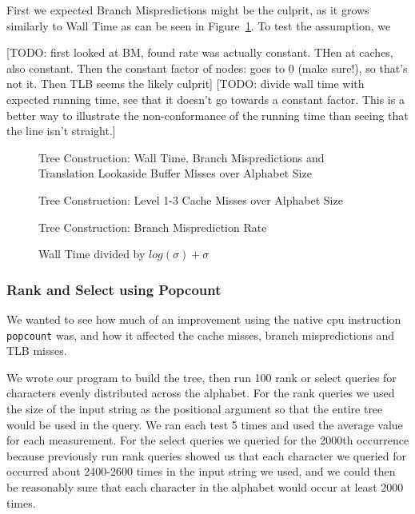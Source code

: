 First we expected Branch Mispredictions might be the culprit, as it grows similarly to Wall Time as can be seen in Figure~\ref{fig:naiveIntegerAlphabetSize_WallTime_BM_TLB}.
To test the assumption, we 

[TODO: first looked at BM, found rate was actually constant. THen at caches, also constant. Then the constant factor of nodes: goes to 0 (make sure!), so that's not it. Then TLB seems the likely culprit]
[TODO: divide wall time with expected running time, see that it doesn't go towards a constant factor. This is a better way to illustrate the non-conformance of the running time than seeing that the line isn't straight.]

\begin{figure}
	
	\caption{Tree Construction: Wall Time, Branch Mispredictions and Translation Lookaside Buffer Misses over Alphabet Size}
	\label{fig:naiveIntegerAlphabetSize_WallTime_BM_TLB}
\end{figure}

\begin{figure}

\caption{Tree Construction: Level 1-3 Cache Misses over Alphabet Size}
\label{fig:naiveIntegerAlphabetSize_CM}
\end{figure}
	
\begin{figure}

\caption{Tree Construction: Branch Misprediction Rate}
\label{fig:naiveIntegerAlphabetSize_BMRate}
\end{figure}
	

\begin{figure}

\caption{Wall Time divided by $log(\sigma) + \sigma$}
\label{fig:naiveIntegerAlphabetSize_WallTime_plusSigma}
\end{figure}




\subsubsection{Rank and Select using Popcount}
\label{sec:experimentPopcountRankSelect}
We wanted to see how much of an improvement using the native cpu instruction \texttt{popcount} was, and how it affected the cache misses, branch mispredictions and TLB misses.

We wrote our program to build the tree, then run 100 rank or select queries for characters evenly distributed across the alphabet.
For the rank queries we used the size of the input string as the positional argument so that the entire tree would be used in the query.
We ran each test 5 times and used the average value for each measurement.
For the select queries we queried for the 2000th occurrence because previously run rank queries showed us that each character we queried for occurred about 2400-2600 times in the input string we used, and we could then be reasonably sure that each character in the alphabet would occur at least 2000 times.

